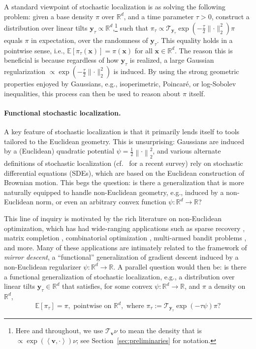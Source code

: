 \documentclass[11pt]{article}
\newcommand{\defeq}{:=}
\newcommand{\norm}[1]{\left\lVert#1\right\rVert}
\newcommand{\norms}[1]{\lVert#1\rVert}
\newcommand{\inprod}[2]{\left\langle#1, #2\right\rangle}
\newcommand{\R}{\mathbb{R}}
\newcommand{\half}{\frac{1}{2}}
\newcommand{\E}{\mathbb{E}}
\newcommand{\Par}[1]{\left(#1\right)}
\newcommand{\Brack}[1]{\left[#1\right]}
\newcommand{\0}{\mathbf{0}}
\newcommand{\1}{\mathbf{1}}
\newcommand{\vv}{\mathbf{v}}
\newcommand{\vx}{\mathbf{x}}
\newcommand{\vy}{\mathbf{y}}
\newcommand{\tilt}{\mathcal{T}}
\begin{document}
A standard viewpoint of stochastic localization is as solving the following problem: given a base density $\pi$ over $\R^d$, and a time parameter $\tau > 0$, construct a distribution over linear tilts $\vy_\tau \propto \R^d$,\footnote{Here and throughout, we use $\tilt_{\vv} \nu$ to mean the density that is $\propto \exp(\inprod{\vv}{\cdot})\nu$; see Section~\ref{sec:preliminaries} for notation.} such that $\pi_\tau \propto \tilt_{\vy_\tau}\exp(-\frac \tau 2 \norms{\cdot}_2^2)\pi$ equals $\pi$ in expectation, over the randomness of $\vy_\tau$. This equality holds in a pointwise sense, i.e., $\E[\pi_\tau(\vx)] = \pi(\vx)$ for all $\vx \in \R^d$. The reason this is beneficial is because regardless of how $\vy_\tau$ is realized, a large Gaussian regularization $\propto \exp(-\frac \tau 2 \norms{\cdot}_2^2)$ is induced. By using the strong geometric properties enjoyed by Gaussians, e.g., isoperimetric, Poincar\'e, or log-Sobolev inequalities, this process can then be used to reason about $\pi$ itself.

\paragraph{Functional stochastic localization.} A key feature of stochastic localization is that it primarily lends itself to tools tailored to the Euclidean geometry. This is unsurprising: Gaussians are induced by a (Euclidean) quadratic potential $\psi = \half\norm{\cdot}_2^2$, and various alternate definitions of stochastic localization (cf.\ \cite{ShiTZ25} for a recent survey) rely on stochastic differential equations (SDEs), which are based on the Euclidean construction of Brownian motion. This begs the question: is there a generalization that is more naturally equipped to handle non-Euclidean geometry, e.g., induced by a non-Euclidean norm, or even an arbitrary convex function $\psi: \R^d \to \R$?

This line of inquiry is motivated by the rich literature on non-Euclidean optimization, which has had wide-ranging applications such as sparse recovery \cite{CandesRT06}, matrix completion \cite{AgarwalNW10}, combinatorial optimization \cite{KelnerLOS14,KyngPSW19}, multi-armed bandit problems \cite{BubeckC12}, and more. Many of these applications are intimately related to the framework of \emph{mirror descent}, a ``functional'' generalization of gradient descent induced by a non-Euclidean regularizer $\psi: \R^d \to \R$. A parallel question would then be: is there a functional generalization of stochastic localization, e.g., a distribution over linear tilts $\vy_\tau \in \R^d$ that satisfies, for some convex $\psi: \R^d \to \R$, and $\pi$ a density on $\R^d$,
\begin{equation}\label{eq:fsl}\E\Brack{\pi_\tau} = \pi, \text{ pointwise on } \R^d,\text{ where } \pi_\tau \defeq \tilt_{\vy_\tau}\exp{\Par{-\tau\psi}}\pi?\end{equation}
\end{document}
